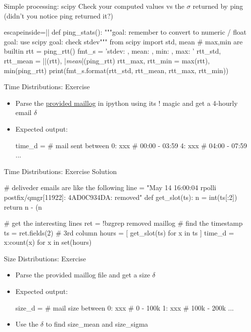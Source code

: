 \begin{pyframe}{Simple processing: scipy}
Check your computed values vs the $\sigma$ returned by ping 
(didn't you notice ping returned it?) 
\begin{pythoncode*}{escapeinside=||}
def ping_stats():
    """goal: remember to convert to numeric / float
       goal: use scipy
       goal: check stdev"""
    from scipy import std, mean # max,min are builtin
    rtt = ping_rtt()
    fmt_s = 'stdev: {}, mean: {}, min: {}, max: {}'
    rtt_std, rtt_mean = ||(rtt), |\emph{mean}|(ping_rtt)
    rtt_max, rtt_min = max(rtt), min(ping_rtt)
    print(fmt_s.format(rtt_std, rtt_mean, rtt_max, rtt_min))
\end{pythoncode*}
\end{pyframe}

\begin{pyframe}{Time Distributions: Exercise}
\begin{itemize}
\item Parse the \href{https://github.com/ioggstream/python-course/blob/master/python-for-sysadmin/data/maillog}{provided maillog} in ipython using its ! magic and get a 4-hourly email $\delta$
\item Expected output: 
\begin{pythoncode}
time_d = {  # mail sent between
    0: xxx  #  00:00 - 03:59
    4: xxx  #  04:00 - 07:59
    ...
    }
\end{pythoncode}
\end{itemize}
\end{pyframe}
 
\iftrue
\begin{pyframe}{Time Distributions: Exercise Solution}
\begin{pythoncode}
# deliveder emails are like the following
line = "May 14 16:00:04 rpolli postfix/qmgr[11922]: 4AD0C934DA: removed"
def get_slot(ts):
    n = int(ts[:2])
    return n - (n%
    
# get the interesting lines
ret = !bzgrep removed maillog
# find the timestamp
ts = ret.fields(2) # 3rd column
hours = [ get_slot(ts)  for x in ts ]
time_d = {x:count(x) for x in set(hours)}
\end{pythoncode}
\end{pyframe}

\fi 

\begin{pyframe}{Size Distributions: Exercise}
\begin{itemize}
\item Parse the provided maillog file and get a size $\delta$
\item Expected output: 
\begin{pythoncode}
size_d = {  # mail size between
    0: xxx  #  0 - 100k
    1: xxx  #  100k - 200k
    ...
    }
\end{pythoncode}
\item Use the $\delta$ to find size\_mean and size\_sigma
\end{itemize}
\end{pyframe}



